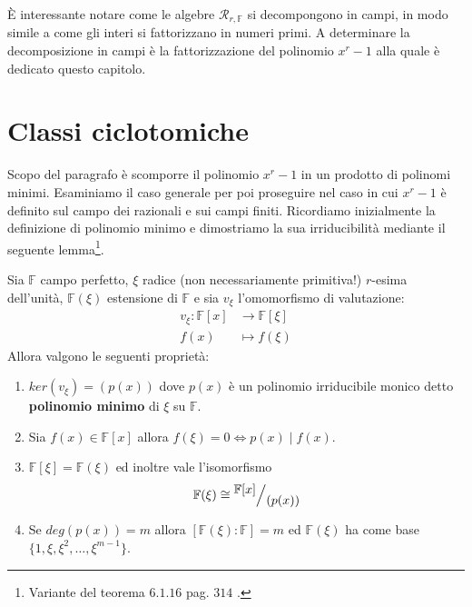 \noindent
È interessante notare come le algebre $\mathcal{R}_{r, \mathbb{F}}$ si
decompongono in campi, in modo simile a come gli interi si fattorizzano in
numeri primi. A determinare la decomposizione in campi è la fattorizzazione del
polinomio $x^r - 1$ alla quale è dedicato questo capitolo.

\section{Classi ciclotomiche}

Scopo del paragrafo è scomporre il polinomio $x^r-1$ in un prodotto di polinomi minimi. Esaminiamo il caso generale per poi proseguire nel caso in cui $x^r-1$ è definito sul campo dei razionali e sui campi finiti. Ricordiamo inizialmente la definizione di polinomio minimo e dimostriamo la sua irriducibilità mediante il seguente lemma\footnote{Variante del teorema $6.1.16$ pag. $314$ \cite{cattaneo}.}.
\begin{lemmax}\label{le:poliMinimo}
   Sia $\mathbb{F}$ campo perfetto, $\xi$ radice (non necessariamente primitiva!) $r$-esima dell'unità,  $\mathbb{F}(\xi)$ estensione di  $\mathbb{F}$ e sia $v_{\xi}$ l'omomorfismo di valutazione:
   \begin{align*}
      v_{\xi}: \mathbb{F}[x]  &\longrightarrow  \mathbb{F}[\xi]  \\
		    f(x) &\longmapsto f(\xi)
   \end{align*}
   Allora valgono le seguenti proprietà:
   \begin{enumerate}
      \item $ker(v_{\xi}) = (p(x))$ dove $p(x)$ è un polinomio irriducibile monico detto {\bf polinomio minimo} di $\xi $ su $\mathbb{F}$.
      \item Sia $f(x) \in \mathbb{F}[x]$ allora $f(\xi) = 0 \iff p(x) \mid f(x)$.
      \item $\mathbb{F}[\xi]=\mathbb{F}(\xi)$ ed inoltre vale l'isomorfismo
        \begin{align*}
           \mathbb{F}(\xi) \cong \quotient{\mathbb{F}[x]}{(p(x))}
        \end{align*}
       \item Se $deg(p(x)) = m$ allora $[\mathbb{F}(\xi): \mathbb{F}] = m$ ed $\mathbb{F}(\xi)$ ha come base $\lbrace1, \xi, \xi^2, \dots, \xi^{m-1} \rbrace$.
   \end{enumerate}
\end{lemmax}
